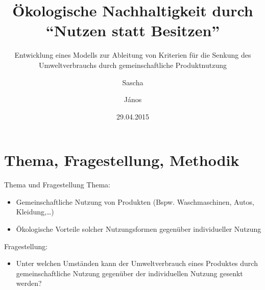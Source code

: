 \documentclass[beamer, xcolor=table]{beamer}
\title{Ökologische Nachhaltigkeit durch \\ \enquote{Nutzen statt Besitzen}}
\subtitle{Entwicklung eines Modells zur Ableitung von Kriterien für die Senkung des Umweltverbrauchs durch gemeinschaftliche Produktnutzung}
\author{Sascha \and János}
\date{29.04.2015}
\begin{document}
\frame{\titlepage}


\section{Thema, Fragestellung, Methodik}

	\begin{frame}{Thema und Fragestellung}
        Thema: 
        \begin{itemize}
            \item Gemeinschaftliche Nutzung von Produkten (Bspw. Waschmaschinen,
                Autos, Kleidung,\dots)
            \item Ökologische Vorteile solcher Nutzungsformen gegenüber
                individueller Nutzung
        \end{itemize}

        \begin{block}{Fragestellung:}
            \begin{itemize}
                \item Unter welchen Umständen kann der Umweltverbrauch eines Produktes durch gemeinschaftliche Nutzung gegenüber der individuellen Nutzung gesenkt werden?
            \end{itemize}
        \end{block}
	\end{frame}
	
\end{document}
